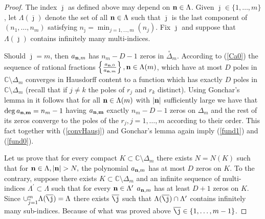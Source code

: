 \documentclass[10pt,a4paper]{article}
\theoremstyle{definition}
\theoremstyle{remark}
\numberwithin{equation}{section}
\begin{document}
\begin{proof}
The index $\overline{\jmath}$ as defined above may depend on  ${\bf n} \in \Lambda$. Given $\overline{\jmath} \in \{1,\ldots,m\}$, let $\Lambda(\overline{\jmath})$ denote the set of all ${\bf n} \in \Lambda$ such that $\overline{\jmath}$ is the last component of $(n_1,\ldots,n_m)$ satisfying $n_{\overline{\jmath}} = \min_{j=1,\ldots,m} (n_j)$. Fix $\overline{\jmath}$ and suppose that $\Lambda(\overline{\jmath})$ contains infinitely many multi-indices.\par
%
Should $\overline{\jmath} = m$, then $a_{{\bf n},m}$ has $n_m -D -1$ zeros in $\stackrel{\circ}{\Delta}_m$. According to (\ref{Ca0}) the sequence of rational fractions $\left\{\frac{a_{{\bf n}, 0}}{a_{{\bf n},m}}\right\}, {\bf n}\in \Lambda(m)$, which have at most $D$ poles in $\mathbb{C}\setminus\Delta_m$ converges in Hausdorff content to a function which has exactly $D$ poles in $\mathbb{C}\setminus\Delta_m$ (recall that if $j\neq k$ the
poles of $r_j$ and $r_k$ distinct). Using Gonchar's lemma in \cite{gon} it follows that for all  ${\bf n}\in \Lambda(m)$ with $\left|{\bf n}\right|$ sufficiently large we have that $\deg a_{{\bf n,m}}=n_m-1$ having $a_{{\bf n,m}}$ exactly $n_m-D-1$ zeros on $\Delta_m$ and the rest of its zeros converge to the poles of the $r_j, j=1,\ldots, m$ according to their order. This fact together with (\ref{convHausj}) and Gonchar's lemma again imply (\ref{fund1}) and (\ref{fund0}).\par

Let us prove that for every compact $K \subset \mathbb{C} \setminus \Delta_m$ there exists $N = N(K)$ such that for ${\bf n} \in \Lambda, |{\bf n}| > N,$ the polynomial $a_{{\bf n},m}$ has at most $D$ zeros on $K$. To the contrary, suppose there exists $K \subset \mathbb{C} \setminus \Delta_m$ and an infinite sequence of multi-indices $\Lambda^{\prime} \subset \Lambda$ such that for every ${\bf n} \in \Lambda^{\prime}$ $a_{{\bf n},m}$ has at least $D+1$ zeros on $K$. Since $\cup_{\overline{j} =1}^m \Lambda(\overline{\j}) = \Lambda$ there exists $\overline{\j}$ such that $\Lambda(\overline{\j}) \cap \Lambda^{\prime}$ contains infinitely many sub-indices. Because of what was proved above $\overline{\j} \in \{1,\ldots,m-1\}$.


\end{proof}
\end{document}
